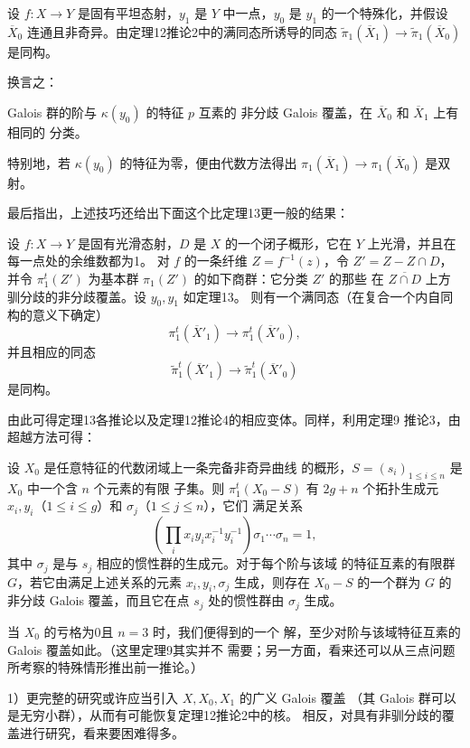  设 $f:X\longrightarrow Y$ 是固有平坦态射，$y_1$
是 $Y$ 中一点，$y_0$ 是 $y_1$ 的一个特殊化，并假设 $\overline X_0$
连通且非奇异。由定理12推论2中的满同态所诱导的同态
$\widetilde\pi_1(\overline X_1)\longrightarrow
\widetilde\pi_1(\overline X_0)$ 是同构。

换言之：

 Galois 群的阶与 $\kappa(y_0)$ 的特征 $p$ 互素的
非分歧 Galois 覆盖，在 $\overline X_0$ 和 $\overline X_1$ 上有相同的
分类。

特别地，若 $\kappa(y_0)$ 的特征为零，便由代数方法得出
$\pi_1(\overline X_1)\longrightarrow\pi_1(\overline X_0)$ 是双射。

最后指出，上述技巧还给出下面这个比定理13更一般的结果：

 设 $f:X\longrightarrow Y$ 是固有光滑态射，$D$ 是
$X$ 的一个闭子概形，它在 $Y$ 上光滑，并且在每一点处的余维数都为1。
对 $f$ 的一条纤维 $Z=f^{-1}(z)$，令 $Z'=Z-Z\cap D$，并令
$\pi_1^t(Z')$ 为基本群 $\pi_1(Z')$ 的如下商群：它分类 $Z'$ 的那些
在 $\overline{Z\cap D}$ 上方驯分歧的非分歧覆盖。设 $y_0,y_1$ 如定理13。
则有一个满同态（在复合一个内自同构的意义下确定）
\[
  \pi_1^t(\overline X'_1)\longrightarrow\pi_1^t(\overline X'_0),
\]
并且相应的同态
\[
  \widetilde\pi_1^t(\overline X'_1)
  \longrightarrow\widetilde\pi_1^t(\overline X'_0)
\]
是同构。

由此可得定理13各推论以及定理12推论4的相应变体。同样，利用定理9
推论3，由超越方法可得：

 设 $X_0$ 是任意特征的代数闭域上一条完备非奇异曲线
的概形，$S=(s_i)_{1\le i\le n}$ 是 $X_0$ 中一个含 $n$ 个元素的有限
子集。则 $\pi_1^t(X_0-S)$ 有 $2g+n$ 个拓扑生成元
$x_i,y_i$（$1\le i\le g$）和 $\sigma_j$（$1\le j\le n$），它们
满足关系
\[
  \left(\prod_i x_i y_i x_i^{-1}y_i^{-1}\right)
  \sigma_1\cdots\sigma_n=1,
\]
其中 $\sigma_j$ 是与 $s_j$ 相应的惯性群的生成元。对于每个阶与该域
的特征互素的有限群 $G$，若它由满足上述关系的元素
$x_i,y_i,\sigma_j$ 生成，则存在 $X_0-S$ 的一个群为 $G$ 的非分歧
Galois 覆盖，而且它在点 $s_j$ 处的惯性群由 $\sigma_j$ 生成。

当 $X_0$ 的亏格为0且 $n=3$ 时，我们便得到的一个
解，至少对阶与该域特征互素的 Galois 覆盖如此。（这里定理9其实并不
需要；另一方面，看来还可以从三点问题所考察的特殊情形推出前一推论。）


1）更完整的研究或许应当引入 $X,X_0,X_1$ 的广义 Galois 覆盖
（其 Galois 群可以是无穷小群），从而有可能恢复定理12推论2中的核。
相反，对具有非驯分歧的覆盖进行研究，看来要困难得多。

